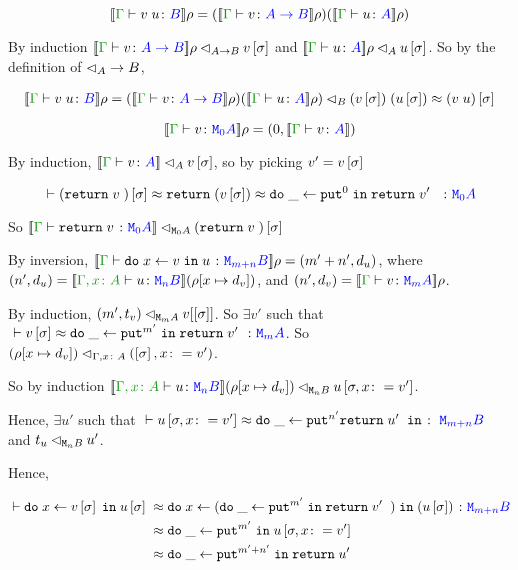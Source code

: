 \documentclass{Report}
\newcommand{\relates}[0]{\lhd}
\newcommand{\logRel}[3]{#1 \relates_{#2} #3}
\newcommand{\zberelation}[3]{\berelation{}{#1}{#2}{#3}}
\renewcommand\put[0]{\texttt{put}}
\newcommand\mnb[0]{\M{n}{B}}
\newcommand\mma[0]{\M{m}{A}}
\begin{document}
\begin{equation}
    \deno{\gtyperelation{\apply{v}{u}}{B}}\rho = (\deno{\gtyperelation{v}{\ab}}\rho)(\deno{\gtyperelation{u}{A}}\rho)
\end{equation}

By induction $\logRel{\deno{\gtyperelation{v}{\ab}}\rho}{\ab}{v\ssi}$ and $\logRel{\deno{\gtyperelation{u}{A}}\rho}{A}{u\ssi}$. So by the definition of $\relates_\ab$, 

\begin{align}
    \deno{\gtyperelation{\apply{v}{u}}{B}}\rho =\logRel{(\deno{\gtyperelation{v}{\ab}}\rho)(\deno{\gtyperelation{u}{A}}\rho)}{B}{\apply{(v\ssi)}{(u\ssi)}\beequiv (\apply{v}{u})\ssi}
\end{align}


\begin{equation}
    \deno{\gtyperelation{v}{\M{0}{A}}}\rho = (0, \deno{\gtyperelation{v}{A}})
\end{equation}

By induction, $\logRel{\deno{\gtyperelation{v}{A}}}{A}{v\ssi}$, so by picking $v' = v\left[\sigma\right]$

\begin{equation}
    \zberelation{(\return{v})\ssi}{\return{(v\ssi)\beequiv \doin{\_}{\put^0}{\return{v'}}}}{\M{0}{A}}
\end{equation}

So $\logRel{\deno{\gtyperelation{\return{v}}{\M{0}{A}}}}{\M{0}{A}}{(\return{v})\ssi}$


By inversion, $\deno{\gtyperelation{\doin{x}{v}{u}}{\M{m+n}{B}}}\rho = (m'+n', d_u)$, where $(n', d_u) = \deno{\typerelation{\gax}{u}{\mnb}}(\rho[x\mapsto d_v])$, and $(n', d_v) = \deno{\gtyperelation{v}{\mma}}\rho$.

By induction, $\logRel{(m', t_v)}{\mma}{v[\ssi]}$. So $\exists v'$ such that $\zberelation{v\ssi}{\doin{\_}{\put^{m'}}{\return{v'}}}{\mma}$. So $\logRel{(\rho[x\mapsto d_v])}{\gax}{(\ssi, x\setto v')}$.

So by induction $\logRel{\deno{\typerelation{\gax}{u}{\mnb}}(\rho[x\mapsto d_v])}{\mnb}{u\sub{\si, x\setto v'}}$.

Hence, $\exists u'$ such that $\zberelation{u\sub{\si, x\setto v'}}{\doin{\_}{\put^{n'}{\return{u'}}}}{\M{m + n}{B}}$ and $\logRel{t_u}{\mnb}{u'}$.

Hence,

\begin{align}
    \zberelation{\doin{x}{v\ssi}{u\ssi}&}{\doin{x}{(\doin{\_}{\put^{m'}}{\return{v'}})}{(u\ssi)}}{\M{m+n}{B}}\\
    &\beequiv\doin{\_}{\put^{m'}}{u\sub{\si, x\setto{v'}}}\\
    &\beequiv\doin{\_}{\put^{m'+n'}}{\return{u'}}
\end{align}
\end{document}
